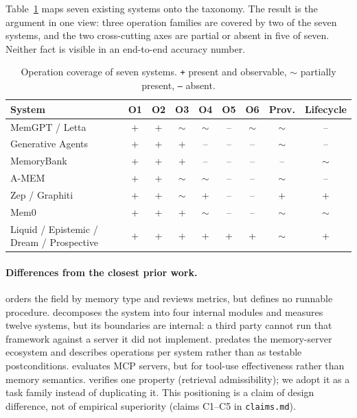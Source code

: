\documentclass[11pt,a4paper]{article}
\begin{document}
Table~\ref{tab:mapping} maps seven existing systems onto the taxonomy. The result is the
argument in one view: three operation families are covered by two of the seven systems, and the
two cross-cutting axes are partial or absent in five of seven. Neither fact is visible in an
end-to-end accuracy number.

\begin{table}[t]
\centering
\small
\begin{tabular}{@{}>{\raggedright\arraybackslash}p{4.55cm}cccccccc@{}}
\toprule
System & O1 & O2 & O3 & O4 & O5 & O6 & Prov. & Lifecycle \\
\midrule
MemGPT / Letta \cite{packer2023memgpt,lettadocs} & + & + & $\sim$ & $\sim$ & -- & $\sim$ & $\sim$ & -- \\
Generative Agents \cite{park2023generative} & + & + & + & -- & -- & -- & $\sim$ & -- \\
MemoryBank \cite{zhong2023memorybank} & + & + & + & -- & -- & -- & -- & $\sim$ \\
A-MEM \cite{xu2025amem} & + & + & $\sim$ & $\sim$ & -- & -- & $\sim$ & -- \\
Zep / Graphiti \cite{rasmussen2025zep,graphiti} & + & + & $\sim$ & + & -- & -- & + & + \\
Mem0 \cite{chhikara2025mem0,mem0docs} & + & + & + & $\sim$ & -- & -- & $\sim$ & $\sim$ \\
Liquid / Epistemic / Dream / Prospective \cite{sintliquid,sintepistemic,sintdream,sintprospective} & + & + & + & + & + & + & $\sim$ & + \\
\bottomrule
\end{tabular}
\caption{Operation coverage of seven systems. \texttt{+} present and observable, $\sim$
partially present, \texttt{--} absent.}
\label{tab:mapping}
\end{table}

\paragraph{Differences from the closest prior work.} \cite{huan2026secondhalf} orders the field
by memory type and reviews metrics, but defines no runnable procedure.
\cite{zhou2026agentnative} decomposes the system into four internal modules and measures twelve
systems, but its boundaries are internal: a third party cannot run that framework against a
server it did not implement. \cite{zhang2024memorysurvey} predates the memory-server ecosystem
and describes operations per system rather than as testable postconditions.
\cite{luo2025mcpbench} evaluates MCP servers, but for tool-use effectiveness rather than memory
semantics. \cite{wang2026rightmemory} verifies one property (retrieval admissibility); we adopt
it as a task family instead of duplicating it. This positioning is a claim of design
difference, not of empirical superiority (claims C1--C5 in \texttt{claims.md}).
\end{document}
